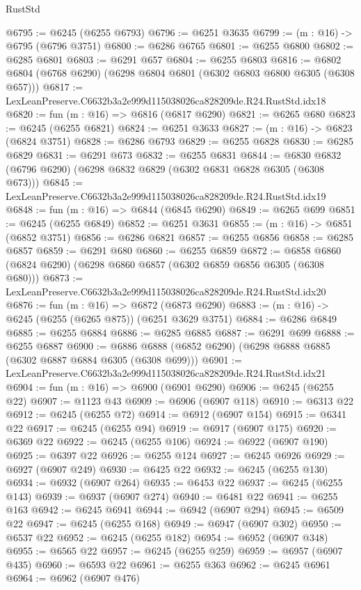 \begin{lexlean}{RustStd}
\begin{coremodule}
@6795 := @6245 (@6255 @6793)
@6796 := @6251 @3635
@6799 := (m : @16) -> @6795 (@6796 @3751)
@6800 := @6286 @6765
@6801 := @6255 @6800
@6802 := @6285 @6801
@6803 := @6291 @657
@6804 := @6255 @6803
@6816 := @6802 @6804 (@6768 @6290) (@6298 @6804 @6801 (@6302 @6803 @6800 @6305 (@6308 @657)))
@6817 := LexLeanPreserve.C6632b3a2e999d115038026ca828209de.R24.RustStd.idx18
@6820 := fun (m : @16) => @6816 (@6817 @6290)
@6821 := @6265 @680
@6823 := @6245 (@6255 @6821)
@6824 := @6251 @3633
@6827 := (m : @16) -> @6823 (@6824 @3751)
@6828 := @6286 @6793
@6829 := @6255 @6828
@6830 := @6285 @6829
@6831 := @6291 @673
@6832 := @6255 @6831
@6844 := @6830 @6832 (@6796 @6290) (@6298 @6832 @6829 (@6302 @6831 @6828 @6305 (@6308 @673)))
@6845 := LexLeanPreserve.C6632b3a2e999d115038026ca828209de.R24.RustStd.idx19
@6848 := fun (m : @16) => @6844 (@6845 @6290)
@6849 := @6265 @699
@6851 := @6245 (@6255 @6849)
@6852 := @6251 @3631
@6855 := (m : @16) -> @6851 (@6852 @3751)
@6856 := @6286 @6821
@6857 := @6255 @6856
@6858 := @6285 @6857
@6859 := @6291 @680
@6860 := @6255 @6859
@6872 := @6858 @6860 (@6824 @6290) (@6298 @6860 @6857 (@6302 @6859 @6856 @6305 (@6308 @680)))
@6873 := LexLeanPreserve.C6632b3a2e999d115038026ca828209de.R24.RustStd.idx20
@6876 := fun (m : @16) => @6872 (@6873 @6290)
@6883 := (m : @16) -> @6245 (@6255 (@6265 @875)) (@6251 @3629 @3751)
@6884 := @6286 @6849
@6885 := @6255 @6884
@6886 := @6285 @6885
@6887 := @6291 @699
@6888 := @6255 @6887
@6900 := @6886 @6888 (@6852 @6290) (@6298 @6888 @6885 (@6302 @6887 @6884 @6305 (@6308 @699)))
@6901 := LexLeanPreserve.C6632b3a2e999d115038026ca828209de.R24.RustStd.idx21
@6904 := fun (m : @16) => @6900 (@6901 @6290)
@6906 := @6245 (@6255 @22)
@6907 := @1123 @43
@6909 := @6906 (@6907 @118)
@6910 := @6313 @22
@6912 := @6245 (@6255 @72)
@6914 := @6912 (@6907 @154)
@6915 := @6341 @22
@6917 := @6245 (@6255 @94)
@6919 := @6917 (@6907 @175)
@6920 := @6369 @22
@6922 := @6245 (@6255 @106)
@6924 := @6922 (@6907 @190)
@6925 := @6397 @22
@6926 := @6255 @124
@6927 := @6245 @6926
@6929 := @6927 (@6907 @249)
@6930 := @6425 @22
@6932 := @6245 (@6255 @130)
@6934 := @6932 (@6907 @264)
@6935 := @6453 @22
@6937 := @6245 (@6255 @143)
@6939 := @6937 (@6907 @274)
@6940 := @6481 @22
@6941 := @6255 @163
@6942 := @6245 @6941
@6944 := @6942 (@6907 @294)
@6945 := @6509 @22
@6947 := @6245 (@6255 @168)
@6949 := @6947 (@6907 @302)
@6950 := @6537 @22
@6952 := @6245 (@6255 @182)
@6954 := @6952 (@6907 @348)
@6955 := @6565 @22
@6957 := @6245 (@6255 @259)
@6959 := @6957 (@6907 @435)
@6960 := @6593 @22
@6961 := @6255 @363
@6962 := @6245 @6961
@6964 := @6962 (@6907 @476)

\end{coremodule}
\end{lexlean}
